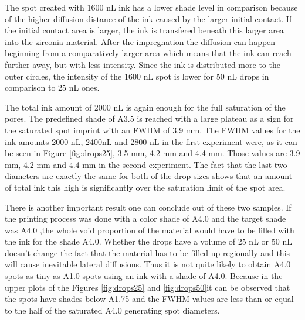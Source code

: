  The spot created with 1600 nL ink has a lower shade level in comparison because of the higher diffusion distance of the ink caused by the larger initial contact. If the initial contact area is larger, the ink is transfered beneath this larger area into the zirconia material. After the impregnation the diffusion can happen beginning from a comparatively larger area which means that the ink can reach further away, but with less intensity. Since the ink is distributed more to the outer circles, the intensity of the 1600 nL spot is lower for 50 nL drops in comparison to 25 nL ones.
  
 The total ink amount of 2000 nL is again enough for the full saturation of the pores. The predefined shade of A3.5 is reached with a large plateau as a sign for the saturated spot imprint with an FWHM of 3.9 mm. The FWHM values for the ink amounts 2000 nL, 2400nL and 2800 nL in the first experiment were, as it can be seen in Figure \ref{fig:drops25}, 3.5 mm, 4.2 mm and 4.4 mm. Those values are 3.9 mm, 4.2 mm and 4.4 mm in the second experiment. The fact that the last two diameters are exactly the same for both of the drop sizes shows that an amount of total ink this high is significantly over the saturation limit of the spot area. 
 
 There is another important result one can conclude out of these two samples. If the printing process was done with a color shade of A4.0 and the target shade was A4.0 ,the whole void proportion of the material would have to be filled with the ink for the shade A4.0. Whether the drops have a volume of 25 nL or 50 nL doesn't change the fact that the material has to be filled up regionally and this will cause inevitable  lateral diffusions. Thus it is not quite likely to obtain A4.0 spots as tiny as A1.0 spots using an ink with a shade of A4.0. Because in the upper plots of the Figures \ref{fig:drops25} and \ref{fig:drops50}it can be observed that the spots have shades below A1.75 and the FWHM values are less than or equal to the half of the saturated A4.0 generating spot diameters.

